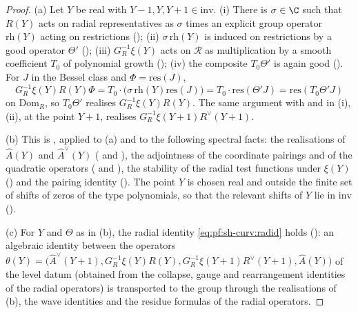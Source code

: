 \begin{proof}
(a) Let $Y$ be real with $Y-1,Y,Y+1\in\mathrm{inv}$. (i) There is $\sigma\in\C$ such that $R(Y)$ acts on radial representatives
as $\sigma$ times an explicit group operator $\mathrm{rh}(Y)$ acting on restrictions
(); (ii) $\sigma\,\mathrm{rh}(Y)$ is induced on
restrictions by a good operator $\Theta'$ ();
(iii) $G_R^{-1}\xi(Y)$ acts on $\mathcal R$ as multiplication by a smooth coefficient $T_0$ of polynomial growth
(); (iv) the composite $T_0\Theta'$ is again good
(). For $J$ in the Bessel class and $\Phi=\mathrm{res}(J)$,
\[
G_R^{-1}\xi(Y)R(Y)\Phi=T_0\cdot\bigl(\sigma\,\mathrm{rh}(Y)\mathrm{res}(J)\bigr)=T_0\cdot\mathrm{res}(\Theta'J)=\mathrm{res}(T_0\Theta'J)
\]
on $\mathrm{Dom}_R$, so $T_0\Theta'$ realises $G_R^{-1}\xi(Y)R(Y)$. The same argument with
 and 
in (i), (ii), at the point $Y+1$, realises $G_R^{-1}\xi(Y+1)R^\vee(Y+1)$.

(b) This is , applied to (a) and to the following spectral
facts: the realisations of $\widehat A(Y)$ and $\widehat A^\vee(Y)$
( and ),
the adjointness of the coordinate pairings and of the quadratic operators
( and ),
the stability of the radial test functions under $\xi(Y)$ () and
the pairing identity (). The point $Y$ is chosen real and
outside the finite set of shifts of zeros of the type polynomials, so that the relevant shifts of $Y$ lie in $\mathrm{inv}$
().

(c) For $Y$ and $\Theta$ as in (b), the radial identity \eqref{eq:pf:sh-curv:radid} holds
(): an algebraic identity between the operators
$\theta(Y)=\bigl(\widehat A^\vee(Y+1),G_R^{-1}\xi(Y)R(Y),G_R^{-1}\xi(Y+1)R^\vee(Y+1),\widehat A(Y)\bigr)$ of the level datum
(obtained from the collapse, gauge and rearrangement identities of the radial operators) is transported to the group through
the realisations of (b), the wave identities and the residue formulas of the radial operators.
\end{proof}

